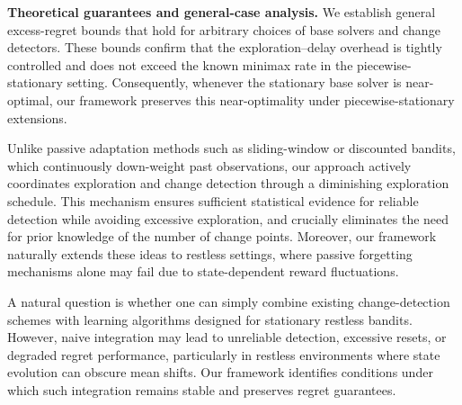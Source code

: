 \documentclass[twoside]{article}
\theoremstyle{plain}
\theoremstyle{definition}
\theoremstyle{remark}
\begin{document}
\textbf{Theoretical guarantees and general-case analysis.} 
We establish general excess-regret bounds that hold for arbitrary choices of base solvers 
and change detectors. These bounds confirm that the exploration–delay overhead is 
tightly controlled and does not exceed the known minimax rate in the piecewise-stationary 
setting. Consequently, whenever the stationary base solver is near-optimal, our 
framework preserves this near-optimality under piecewise-stationary extensions. 

Unlike passive adaptation methods such as sliding-window or discounted bandits, which continuously down-weight past observations, our approach actively coordinates exploration and change detection through a diminishing exploration schedule. This mechanism ensures sufficient statistical evidence for reliable detection while avoiding excessive exploration, and crucially eliminates the need for prior knowledge of the number of change points. Moreover, our framework naturally extends these ideas to restless settings, where passive forgetting mechanisms alone may fail due to state-dependent reward fluctuations.

A natural question is whether one can simply combine existing change-detection schemes with learning algorithms designed for stationary restless bandits. However, naive integration may lead to unreliable detection, excessive resets, or degraded regret performance, particularly in restless environments where state evolution can obscure mean shifts. Our framework identifies conditions under which such integration remains stable and preserves regret guarantees.
\vspace{-5pt}
\end{document}
